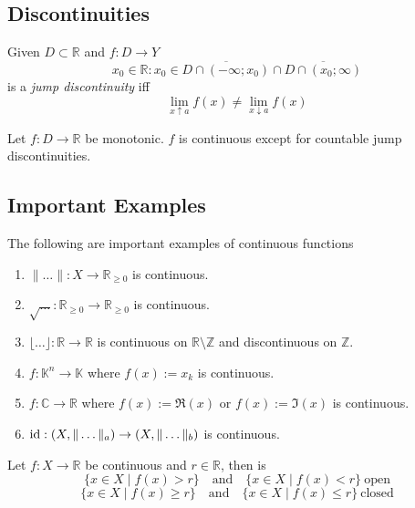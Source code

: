 \subsection{Discontinuities}

\begin{definition}
   Given \(D \subset \mathbb{R}\) and \(f: D \to Y\)
   \[x_0 \in \mathbb{R}: x_0 \in \overline{D \cap (-\infty; x_0)} \cap \overline{D \cap (x_0; \infty)}\]
   is a \emph{jump discontinuity} iff
   \[\lim_{x \uparrow a} f(x) \neq \lim_{x \downarrow a} f(x)\]
\end{definition}

\begin{theorem}
   Let \(f:D \to \mathbb{R}\) be monotonic.
   \(f\) is continuous except for countable jump discontinuities.
\end{theorem}

\subsection{Important Examples}
\begin{proposition}
   The following are important examples of continuous functions
   \begin{enumerate}[label=\roman*, align=Center]
      \item \(\|\ldots\|: X \to \mathbb{R}_{\geq 0}\) is continuous.
      \item \(\sqrt{\ldots}: \mathbb{R}_{\geq 0} \to \mathbb{R}_{\geq 0}\) is continuous.
      \item \(\lfloor\ldots\rfloor: \mathbb{R} \to \mathbb{R}\) is continuous on \(\mathbb{R}\setminus\mathbb{Z}\) and discontinuous on \(\mathbb{Z}\).
      \item \(f: \mathbb{K}^n \to \mathbb{K}\) where \(f(x) := x_k\) is continuous.
      \item \(f: \mathbb{C} \to \mathbb{R}\) where \(f(x) := \Re(x)\) or \(f(x) := \Im(x)\) is continuous.
      \item \(\operatorname{id}: (X, \|\ldots\|_a) \to (X, \|\ldots\|_b)\) is continuous.
   \end{enumerate}
\end{proposition}

\begin{proposition}
   Let \(f: X \to \mathbb{R}\) be continuous and \(r \in \mathbb{R}\), then is
   \[\{x \in X \mid f(x) > r\} \quad\text{and}\quad \{x \in X \mid f(x) < r\}~\text{open}\]
   \[\{x \in X \mid f(x) \geq r\} \quad\text{and}\quad \{x \in X \mid f(x) \leq r\}~\text{closed}\]
\end{proposition}

